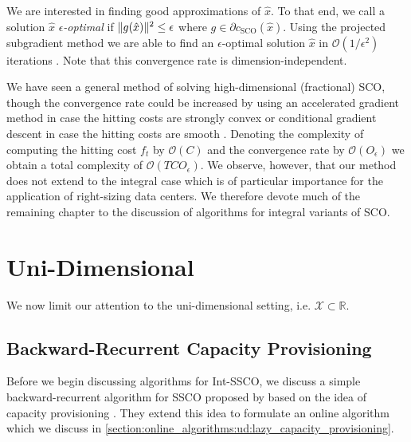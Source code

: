 We are interested in finding good approximations of $\hat{x}$. To that end, we call a solution $\hat{x}$ \emph{$\epsilon$-optimal} if $\lVert g(\hat{x})\rVert^2 \leq \epsilon$ where $g \in \partial c_{\text{SCO}}(\hat{x})$. Using the projected subgradient method we are able to find an $\epsilon$-optimal solution $\hat{x}$ in $\mathcal{O}(1 / \epsilon^2)$ iterations \cite{Boyd2003}. Note that this convergence rate is dimension-independent.

We have seen a general method of solving high-dimensional (fractional) SCO, though the convergence rate could be increased by using an accelerated gradient method in case the hitting costs are strongly convex or conditional gradient descent in case the hitting costs are smooth \cite{Bubeck2015}. Denoting the complexity of computing the hitting cost $f_t$ by $\mathcal{O}(C)$ and the convergence rate by $\mathcal{O}(O_{\epsilon})$ we obtain a total complexity of $\mathcal{O}(T C O_{\epsilon})$. We observe, however, that our method does not extend to the integral case which is of particular importance for the application of right-sizing data centers. We therefore devote much of the remaining chapter to the discussion of algorithms for integral variants of SCO.

\section{Uni-Dimensional}

We now limit our attention to the uni-dimensional setting, i.e. $\mathcal{X} \subset \mathbb{R}$.

\subsection{Backward-Recurrent Capacity Provisioning}

Before we begin discussing algorithms for Int-SSCO, we discuss a simple backward-recurrent algorithm for SSCO proposed by \citeauthor*{Lin2011} based on the idea of capacity provisioning \cite{Lin2011}. They extend this idea to formulate an online algorithm which we discuss in \autoref{section:online_algorithms:ud:lazy_capacity_provisioning}.

